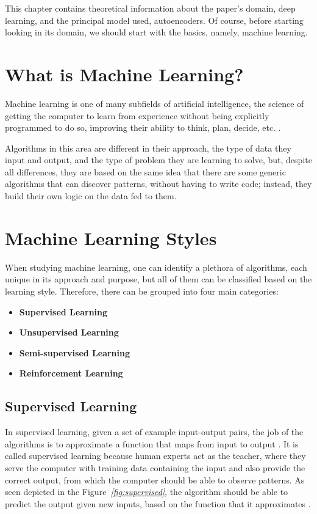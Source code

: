 This chapter contains theoretical information about the paper's domain, deep learning,
and the principal model used, autoencoders.
Of course, before starting looking in its domain,
we should start with the basics, namely, machine learning.
\section{What is Machine Learning?}

Machine learning is one of many subfields of artificial intelligence,
the science of getting the computer to learn from experience
without being explicitly programmed to do so,
improving their ability to think, plan, decide, etc. \cite{whatIsML}.\par
Algorithms in this area are different in their approach, the type of data they input and output,
and the type of problem they are learning to
solve, but, despite all differences, they are based on the same idea that there are some
generic algorithms that can discover patterns,
without having to write code; instead, they build their own logic on the data fed to them.

\section{Machine Learning Styles}
When studying machine learning, one can identify a plethora of algorithms,
each unique in its approach and purpose, but all of them can be classified
based on the learning style. Therefore, there can be grouped into four main categories:
\begin{itemize}
    \item \textbf{Supervised Learning}
    \item \textbf{Unsupervised Learning}
    \item \textbf{Semi-supervised Learning}
    \item \textbf{Reinforcement Learning}
\end{itemize}
\vspace{0.5cm}

\subsection{Supervised Learning}
In supervised learning, given a set of example input-output pairs,
the job of the algorithms is to approximate a function that maps from input to output \cite{amai}.
It is called supervised learning because human experts act as the teacher,
where they serve the computer with training data containing the input and
also provide the correct output, from which the computer should be able to observe patterns.
As seen depicted in the Figure\emph{~\ref{fig:supervised}}, the algorithm should be able
to predict the output given new inputs,
based on  the function that it approximates \cite{typesMLMedium}.

